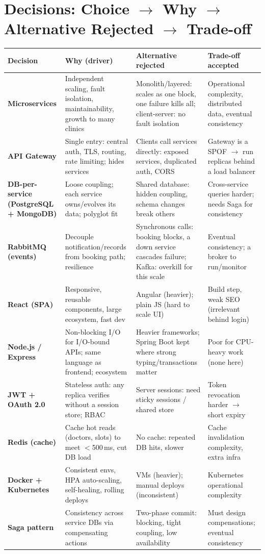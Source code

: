 \documentclass[10pt,a4paper]{article}
\begin{document}
\section{Decisions: Choice $\rightarrow$ Why $\rightarrow$ Alternative Rejected $\rightarrow$ Trade-off}
\vspace{1pt}
{\scriptsize
\begin{tabular}{@{}>{\bfseries}p{2.15cm} p{4.35cm} p{4.55cm} p{4.7cm}@{}}
\toprule
\textbf{Decision} & \textbf{Why (driver)} & \textbf{Alternative rejected} & \textbf{Trade-off accepted}\\
\midrule
Microservices & Independent scaling, fault isolation, maintainability, growth to many clinics
& Monolith/layered: scales as one block, one failure kills all; client-server: no fault
isolation & Operational complexity, distributed data, eventual consistency\\
API Gateway & Single entry: central auth, TLS, routing, rate limiting; hides services
& Clients call services directly: exposed services, duplicated auth, CORS & Gateway is a SPOF
$\rightarrow$ run replicas behind a load balancer\\
DB-per-service (PostgreSQL + MongoDB) & Loose coupling; each service owns/evolves its data;
polyglot fit & Shared database: hidden coupling, schema changes break others & Cross-service
queries harder; needs Saga for consistency\\
RabbitMQ (events) & Decouple notification/records from booking path; resilience & Synchronous
calls: booking blocks, a down service cascades failure; Kafka: overkill for this scale &
Eventual consistency; a broker to run/monitor\\
React (SPA) & Responsive, reusable components, large ecosystem, fast dev & Angular (heavier);
plain JS (hard to scale UI) & Build step, weak SEO (irrelevant behind login)\\
Node.js / Express & Non-blocking I/O for I/O-bound APIs; same language as frontend; ecosystem
& Heavier frameworks; Spring Boot kept where strong typing/transactions matter & Poor for
CPU-heavy work (none here)\\
JWT + OAuth 2.0 & Stateless auth: any replica verifies without a session store; RBAC & Server
sessions: need sticky sessions / shared store & Token revocation harder $\rightarrow$ short
expiry\\
Redis (cache) & Cache hot reads (doctors, slots) to meet $<$500\,ms, cut DB load & No cache:
repeated DB hits, slower & Cache invalidation complexity, extra infra\\
Docker + Kubernetes & Consistent envs, HPA auto-scaling, self-healing, rolling deploys &
VMs (heavier); manual deploys (inconsistent) & Kubernetes operational complexity\\
Saga pattern & Consistency across service DBs via compensating actions & Two-phase commit:
blocking, tight coupling, low availability & Must design compensations; eventual consistency\\
\bottomrule
\end{tabular}}
\end{document}
